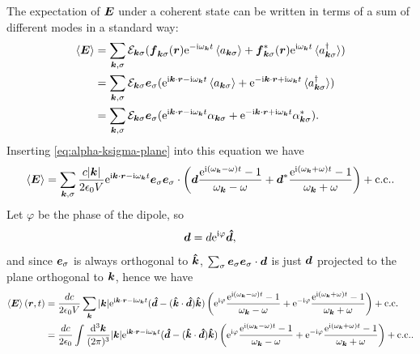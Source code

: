 \documentclass[hyperref, a4paper]{article}
\newcommand*{\ii}{\mathrm{i}}
\newcommand*{\ee}{\mathrm{e}}
\begin{document}
The expectation of $\vb*{E}$ under a coherent state can be written in terms of a sum of different modes in a standard way:
\[
    \begin{aligned}
        \expval{\vb*{E}} &= \sum_{\vb*{k}, \sigma} \mathcal{E}_{\vb*{k} \sigma} (\vb*{f}_{\vb*{k} \sigma}(\vb*{r}) \ee^{- \ii \omega_{\vb*{k}} t} \expval{a_{\vb*{k} \sigma}} + \vb*{f}^*_{\vb*{k} \sigma}(\vb*{r}) \ee^{\ii \omega_{\vb*{k}} t} \expval*{a^\dagger_{\vb*{k} \sigma}}) \\
        &= \sum_{\vb*{k}, \sigma} \mathcal{E}_{\vb*{k} \sigma} \vb*{e}_\sigma ( \ee^{\ii \vb*{k} \cdot \vb*{r} - \ii \omega_{\vb*{k}} t} \expval{a_{\vb*{k} \sigma}} + \ee^{- \ii \vb*{k} \cdot \vb*{r} + \ii \omega_{\vb*{k}} t} \expval*{a^\dagger_{\vb*{k} \sigma}}) \\
        &= \sum_{\vb*{k}, \sigma} \mathcal{E}_{\vb*{k} \sigma} \vb*{e}_\sigma ( \ee^{\ii \vb*{k} \cdot \vb*{r} - \ii \omega_{\vb*{k}} t} \alpha_{\vb*{k} \sigma} + \ee^{- \ii \vb*{k} \cdot \vb*{r} + \ii \omega_{\vb*{k}} t} \alpha_{\vb*{k} \sigma}^*).
    \end{aligned}
\]
Inserting \eqref{eq:alpha-ksigma-plane} into this equation we have 
\[
    \expval{\vb*{E}} = \sum_{\vb*{k} , \sigma} \frac{c \abs{\vb*{k}}}{2 \epsilon_0 V} \ee^{\ii \vb*{k} \cdot \vb*{r} - \ii \omega_{\vb*{k}} t} \vb*{e}_\sigma \vb*{e}_\sigma \cdot \left( \vb*{d} \frac{\ee^{\ii (\omega_{\vb*{k}} - \omega) t} - 1}{\omega_{\vb*{k}} - \omega} + \vb*{d}^* \frac{\ee^{\ii (\omega_{\vb*{k}} + \omega) t} - 1}{\omega_{\vb*{k}} + \omega} \right) + \text{c.c.}.
\]
Let $\varphi$ be the phase of the dipole, so 
\[
    \vb*{d} = d \ee^{\ii \varphi} \vu*{d} ,
\]
and since $\vb*{e}_\sigma$ is always orthogonal to $\vu*{k}$, $\sum_\sigma \vb*{e}_\sigma \vb*{e}_\sigma \cdot \vb*{d}$ is just $\vb*{d}$ projected to the plane orthogonal to $\vb*{k}$, hence we have 
\begin{equation}
    \begin{aligned}
        \expval{\vb*{E}}(\vb*{r}, t) &= \frac{d c}{2 \epsilon_0 V} \sum_{\vb*{k}} \abs{\vb*{k}} \ee^{\ii \vb*{k} \cdot \vb*{r} - \ii \omega_{\vb*{k}} t} (\vu*{d} - (\vu*{k} \cdot \vu*{d}) \vu*{k}) \left( \ee^{\ii \varphi} \frac{\ee^{\ii (\omega_{\vb*{k}} - \omega) t} - 1}{\omega_{\vb*{k}} - \omega} + \ee^{- \ii \varphi} \frac{\ee^{\ii (\omega_{\vb*{k}} + \omega) t} - 1}{\omega_{\vb*{k}} + \omega} \right) + \text{c.c.} \\
        &= \frac{d c}{2 \epsilon_0 } \int \frac{\dd[3]{\vb*{k}}}{(2\pi)^3} \abs{\vb*{k}} \ee^{\ii \vb*{k} \cdot \vb*{r} - \ii \omega_{\vb*{k}} t} (\vu*{d} - (\vu*{k} \cdot \vu*{d}) \vu*{k}) \left( \ee^{\ii \varphi} \frac{\ee^{\ii (\omega_{\vb*{k}} - \omega) t} - 1}{\omega_{\vb*{k}} - \omega} + \ee^{- \ii \varphi} \frac{\ee^{\ii (\omega_{\vb*{k}} + \omega) t} - 1}{\omega_{\vb*{k}} + \omega} \right) + \text{c.c.}.
    \end{aligned}
\end{equation}
\end{document}

